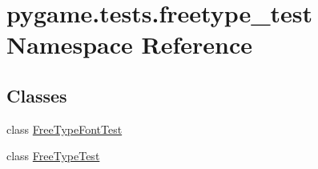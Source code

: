 \hypertarget{namespacepygame_1_1tests_1_1freetype__test}{}\section{pygame.\+tests.\+freetype\+\_\+test Namespace Reference}
\label{namespacepygame_1_1tests_1_1freetype__test}
\subsection*{Classes}
\begin{DoxyCompactItemize}
\item 
class \hyperlink{classpygame_1_1tests_1_1freetype__test_1_1_free_type_font_test}{Free\+Type\+Font\+Test}
\item 
class \hyperlink{classpygame_1_1tests_1_1freetype__test_1_1_free_type_test}{Free\+Type\+Test}
\end{DoxyCompactItemize}

